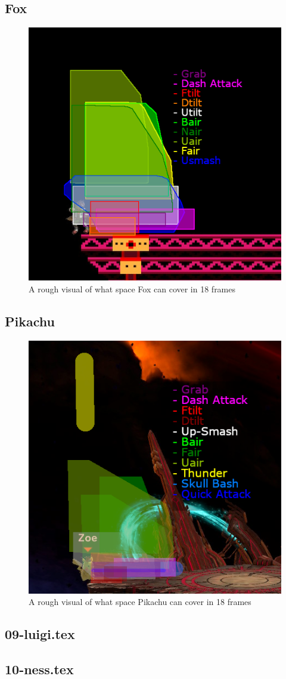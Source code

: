 \subsection{Fox}
\begin{figure}[H]
    \centering
    \includegraphics[width=.4\textwidth]{images/threat-ranges/fox}
    \caption{A rough visual of what space Fox can cover in 18 frames\cite{ref:threat-range:fox}}
\end{figure}

\subsection{Pikachu}
\begin{figure}[H]
    \centering
    \includegraphics[width=.4\textwidth]{images/threat-ranges/pika}
    \caption{A rough visual of what space Pikachu can cover in 18 frames\cite{ref:threat-range:pika}}
\end{figure}

\subsection{09-luigi.tex}
\subsection{10-ness.tex}
